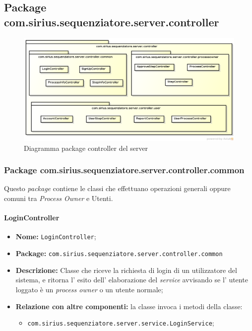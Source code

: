 \subsection{Package com.sirius.sequenziatore.server.controller}
\begin{figure}[H] \centering \includegraphics[width=%
\textwidth]
{./pack/servercontroller.png} \caption{Diagramma package controller del server}
\end{figure}
\subsubsection{Package com.sirius.sequenziatore.server.controller.common}
Questo \textit{package} contiene le classi che effettuano operazioni generali oppure comuni tra \textit{Process Owner} e Utenti.
\paragraph{LoginController}
	\begin{itemize}
		\item \textbf{Nome:} \texttt{LoginController};
		\item \textbf{Package:} \texttt{com.sirius.sequenziatore.server.controller.common}
		\item \textbf{Descrizione:} Classe che riceve la richiesta di login di un utilizzatore del sistema, e ritorna l' esito dell' elaborazione del \textit{service} avvisando se l' utente loggato è un \textit{process owner} o un utente normale;
		\item \textbf{Relazione con altre componenti:} la classe invoca i metodi della classe:
		\begin{itemize}
			\item \texttt{com.sirius.sequenziatore.server.service.LoginService};
		\end{itemize}
	\end{itemize}
	
